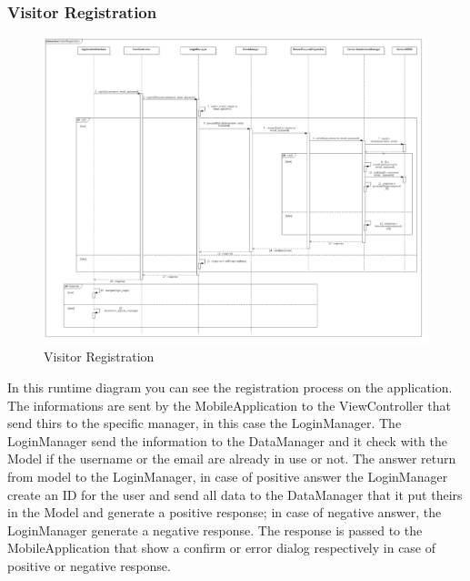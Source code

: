 \subsubsection{Visitor Registration}
\begin{figure}[!h]
\centering
\includegraphics[scale=0.25]{images/VisitorRegistration}
\caption{Visitor Registration}
\end{figure}
\bigskip 
\noindent
In this runtime diagram you can see the registration process on the application. The informations are sent by the MobileApplication to the ViewController that send thirs to the specific manager, in this case the LoginManager. The LoginManager send the information to the DataManager and it check with the Model if the username or the email are already in use or not. The answer return from model to the LoginManager, in case of positive answer the LoginManager create an ID for the user and send all data to the DataManager that it put theirs in the Model and generate a positive response; in case of negative answer, the LoginManager generate a negative response. The response is passed to the MobileApplication that show a confirm or error dialog respectively in case of positive or negative response.

